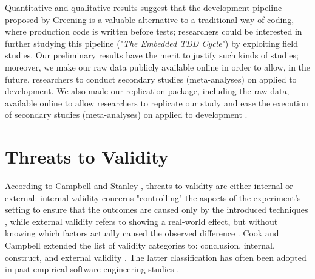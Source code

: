 Quantitative and qualitative results suggest that the development pipeline proposed by Greening\cite{TDDEC} is a valuable alternative to a traditional way of coding, where production code is written before tests; researchers could be interested in further studying this pipeline (\ie "\textit{The Embedded TDD Cycle}") by exploiting field studies. 
Our preliminary results have the merit to justify such kinds of studies; moreover, we make our raw data publicly available online in order to allow, in the future, researchers to conduct secondary studies (\eg meta-analyses) on \tdd applied to \ess development.
We also made our replication package, including the raw data, available online to allow researchers to replicate our study and ease the execution of secondary studies (\eg meta-analyses) on \tdd applied to \ess development \cite{RepPackage}.

\section{Threats to Validity}
According to Campbell and Stanley \cite{ResearchOfTeaching}, threats to validity are either internal or external: internal validity concerns "controlling" the aspects of the experiment's setting to ensure that the outcomes are caused only by the introduced techniques \cite{DBLP:conf/icse/SiegmundSA15}, while external validity refers to showing a real-world effect, but without knowing which factors actually caused the observed difference \cite{DBLP:conf/icse/SiegmundSA15}.
Cook and Campbell extended the list of validity categories to: conclusion, internal, construct, and external validity \cite{QuasiExp}. The latter classification has often been adopted in past empirical software engineering studies \cite{DBLP:books/sp/WohlinRHOR00}. 


